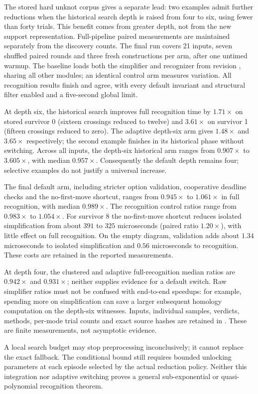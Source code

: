 The stored hard unknot corpus gives a separate lead: two examples admit
further reductions when the historical search depth is raised from four to
six, using fewer than forty trials.  This benefit comes from greater depth,
not from the new support representation.  Full-pipeline paired measurements
are maintained separately from the discovery counts.  The final run covers
21 inputs, seven shuffled paired rounds and three fresh constructions per
arm, after one untimed warmup.  The baseline loads both the simplifier and
recognizer from revision , sharing all other modules;
an identical control arm measures variation.  All recognition results finish
and agree, with every default invariant and structural filter enabled and
a five-second global limit.

At depth six, the historical search improves full recognition time by
$1.71\times$ on stored survivor 0 (sixteen crossings reduced to twelve)
and $3.61\times$ on survivor 1 (fifteen crossings reduced to zero).
The adaptive depth-six arm gives $1.48\times$ and $3.65\times$ respectively;
the second example finishes in its historical phase without switching.
Across all inputs, the depth-six historical arm ranges from $0.907\times$
to $3.605\times$, with median $0.957\times$.  Consequently the default
depth remains four; selective examples do not justify a universal increase.

The final default arm, including stricter option validation, cooperative
deadline checks and the no-first-move shortcut, ranges from $0.945\times$
to $1.061\times$ in full recognition, with median $0.989\times$.
The recognition control ratios range from $0.983\times$ to $1.054\times$.
For survivor 8 the no-first-move shortcut reduces isolated simplification
from about $391$ to $325$ microseconds (paired ratio $1.20\times$), with
little effect on full recognition.  On the empty diagram, validation adds
about $1.34$ microseconds to isolated simplification and $0.56$ microseconds
to recognition.  These costs are retained in the reported measurements.

At depth four, the clustered and adaptive full-recognition median ratios
are $0.942\times$ and $0.931\times$; neither supplies evidence for a default
switch.  Raw simplifier ratios must not be confused with end-to-end speedups:
for example, spending more on simplification can save a larger subsequent
homology computation on the depth-six witnesses.  Inputs, individual samples,
verdicts, methods, per-mode trial counts and exact source hashes are retained
in .  These are finite
measurements, not asymptotic evidence.

A local search budget may stop preprocessing inconclusively; it cannot
replace the exact fallback.  The conditional bound still requires bounded
unlocking parameters at each episode selected by the actual reduction
policy.  Neither this integration nor adaptive switching proves a general
sub-exponential or quasi-polynomial recognition theorem.
